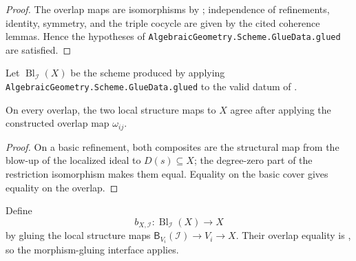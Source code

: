 \begin{proof}
  \leanok
  The overlap maps are isomorphisms by
  ; independence of refinements,
  identity, symmetry, and the triple cocycle are given by the cited coherence
  lemmas.  Hence the hypotheses of
  \texttt{AlgebraicGeometry.Scheme.GlueData.glued} are satisfied.
\end{proof}

\begin{definition}
  \label{def:nagata-global-blowup}
  \leanok

  Let $\operatorname{Bl}_{\mathcal I}(X)$ be the scheme produced by applying
  \texttt{AlgebraicGeometry.Scheme.GlueData.glued} to the valid datum of
  .
\end{definition}

\begin{lemma}
  \label{lemma:nagata-global-blowup-local-maps-agree}
  \leanok

  On every overlap, the two local structure maps to $X$ agree after applying
  the constructed overlap map $\omega_{ij}$.
\end{lemma}

\begin{proof}
  \leanok
  On a basic refinement, both composites are the structural map from the
  blow-up of the localized ideal to $D(s)\subseteq X$; the degree-zero part of
  the restriction isomorphism makes them equal.  Equality on the basic cover
  gives equality on the overlap.
\end{proof}

\begin{definition}
  \label{def:nagata-global-blowup-map}
  \leanok

  Define
  \[
    b_{X,\mathcal I}\colon\operatorname{Bl}_{\mathcal I}(X)\longrightarrow X
  \]
  by gluing the local structure maps
  $\mathsf B_{V_i}(\mathcal I)\to V_i\to X$.  Their overlap equality is
  , so the morphism-gluing
  interface applies.
\end{definition}

